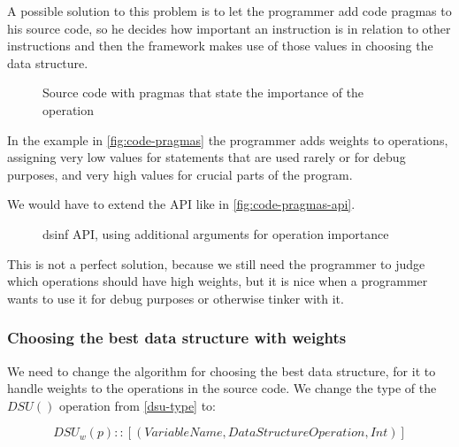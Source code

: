 \documentclass[a4paper,11pt]{article}
\begin{document}
			A possible solution to this problem is to let the programmer add code pragmas to his source
			code, so he decides how important an instruction is in relation to other instructions and then
			the framework makes use of those values in choosing the data structure.

            \begin{figure}[!h]
				

				\caption{Source code with pragmas that state the importance of the operation}

				\label{fig:code-pragmas}
			\end{figure}

            In the example in \autoref{fig:code-pragmas} the programmer adds weights to operations, assigning very low values
			for statements that are used rarely or for debug purposes, and very high values for crucial
			parts of the program.

            We would have to extend the API like in \autoref{fig:code-pragmas-api}.

            \begin{figure}[!h]
				

				\caption{dsinf API, using additional arguments for operation importance}

				\label{fig:code-pragmas-api}
			\end{figure}

			This is not a perfect solution, because we still need the programmer to judge which operations
			should have high weights, but it is nice when a programmer wants to use it for debug purposes or
			otherwise tinker with it.

		\subsubsection{Choosing the best data structure with weights} \label{sec:choose-weights}

			We need to change the algorithm for choosing the best data structure, for it to handle weights
			to the operations in the source code. We change the type of the $DSU()$ operation from
			\autoref{dsu-type} to:

			\begin{equation}
				\mathit{DSU}_w(p) :: [(\mathit{VariableName}, \mathit{DataStructureOperation}, \mathit{Int})]
			\end{equation}
\end{document}
